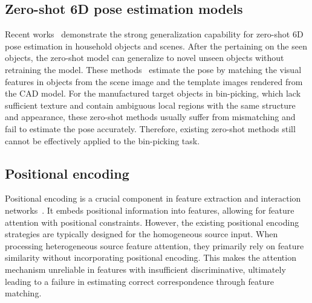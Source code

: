 \subsection{Zero-shot 6D pose estimation models}
Recent works~\cite{chen2023zeropose, sam6d, nguyen2024gigapose, ornek2023foundpose, FoundationPose, shugurov2022cvpr:osop, gcpose, ausserlechner2023zs6d, park2020latentfusion} demonstrate the strong generalization capability for zero-shot 6D pose estimation in household objects and scenes.
After the pertaining on the seen objects, the zero-shot model can generalize to novel unseen objects without retraining the model.
%
These methods~\cite{chen2023zeropose,sam6d, nguyen2024gigapose, ornek2023foundpose, shugurov2022cvpr:osop} estimate the pose by matching the visual features in objects from the scene image and the template images rendered from the CAD model. 
For the manufactured target objects in bin-picking, which lack sufficient texture and contain ambiguous local regions with the same structure and appearance, these zero-shot methods usually suffer from mismatching and fail to estimate the pose accurately. Therefore, existing zero-shot methods still cannot be effectively applied to the bin-picking task.


\subsection{Positional encoding}
Positional encoding is a crucial component in feature extraction and interaction networks~\cite{vaswani2017attention, liu2022petr, pointnet, pointnet++, qin2023geotransformer}. It embeds positional information into features, allowing for feature attention with positional constraints. However, the existing positional encoding strategies are typically designed for the homogeneous source input. When processing heterogeneous source feature attention, they primarily rely on feature similarity without incorporating positional encoding. 
This makes the attention mechanism unreliable in features with insufficient discriminative, ultimately leading to a failure in estimating correct correspondence through feature matching.